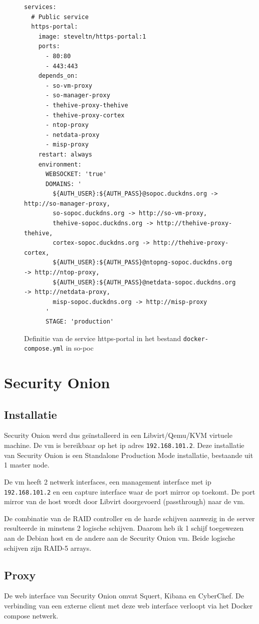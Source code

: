 \documentclass[a4paper, 12pt]{report}
\begin{document}
\begin{figure}[H]
  \begin{lstlisting}
services:
  # Public service
  https-portal:
    image: steveltn/https-portal:1
    ports:
      - 80:80
      - 443:443
    depends_on:
      - so-vm-proxy
      - so-manager-proxy
      - thehive-proxy-thehive
      - thehive-proxy-cortex
      - ntop-proxy
      - netdata-proxy
      - misp-proxy
    restart: always
    environment:
      WEBSOCKET: 'true'
      DOMAINS: '
        ${AUTH_USER}:${AUTH_PASS}@sopoc.duckdns.org -> http://so-manager-proxy,
        so-sopoc.duckdns.org -> http://so-vm-proxy,
        thehive-sopoc.duckdns.org -> http://thehive-proxy-thehive,
        cortex-sopoc.duckdns.org -> http://thehive-proxy-cortex,
        ${AUTH_USER}:${AUTH_PASS}@ntopng-sopoc.duckdns.org -> http://ntop-proxy,
        ${AUTH_USER}:${AUTH_PASS}@netdata-sopoc.duckdns.org -> http://netdata-proxy,
        misp-sopoc.duckdns.org -> http://misp-proxy
      '
      STAGE: 'production'
  \end{lstlisting}
  \caption{Definitie van de service https-portal in het bestand \lstinline|docker-compose.yml| in so-poc}
  \label{fig:https-portal-compose}
\end{figure}

\section{Security Onion}
\subsection{Installatie}
Security Onion werd dus geïnstalleerd in een Libvirt/Qemu/KVM virtuele machine.
De vm is bereikbaar op het ip adres \lstinline|192.168.101.2|.
Deze installatie van Security Onion is een Standalone Production Mode installatie, bestaande uit 1 master node.

De vm heeft 2 netwerk interfaces, een management interface met ip \lstinline|192.168.101.2| en een capture interface waar de port mirror op toekomt.
De port mirror van de host wordt door Libvirt doorgevoerd (passthrough) naar de vm.

De combinatie van de RAID controller en de harde schijven aanwezig in de server resulteerde in minstens 2 logische schijven.
Daarom heb ik 1 schijf toegewezen aan de Debian host en de andere aan de Security Onion vm.
Beide logische schijven zijn RAID-5 arrays.

\subsection{Proxy}
De web interface van Security Onion omvat Squert, Kibana en CyberChef.
De verbinding van een externe client met deze web interface verloopt via het Docker compose netwerk.
\end{document}
